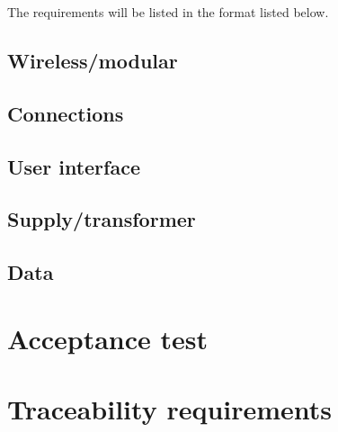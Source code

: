 The requirements will be listed in the format listed below.\\



\subsection{Wireless/modular}


\subsection{Connections}


\subsection{User interface}


\subsection{Supply/transformer}


\subsection{Data}




\section{Acceptance test}


\section{Traceability requirements}

